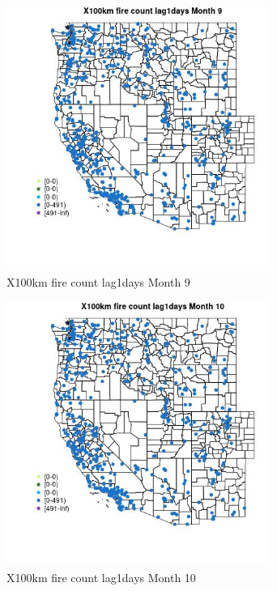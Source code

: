 \begin{figure} 
\centering  
\includegraphics[width=0.77\textwidth]{Code_Outputs/Report_ML_input_PM25_Step4_part_e_de_duplicated_aves_compiled_2019-05-14wNAs_MapObsMo9X100km_fire_count_lag1days.jpg} 
\caption{\label{fig:Report_ML_input_PM25_Step4_part_e_de_duplicated_aves_compiled_2019-05-14wNAsMapObsMo9X100km_fire_count_lag1days}X100km fire count lag1days Month 9} 
\end{figure} 
 

\begin{figure} 
\centering  
\includegraphics[width=0.77\textwidth]{Code_Outputs/Report_ML_input_PM25_Step4_part_e_de_duplicated_aves_compiled_2019-05-14wNAs_MapObsMo10X100km_fire_count_lag1days.jpg} 
\caption{\label{fig:Report_ML_input_PM25_Step4_part_e_de_duplicated_aves_compiled_2019-05-14wNAsMapObsMo10X100km_fire_count_lag1days}X100km fire count lag1days Month 10} 
\end{figure} 
 

